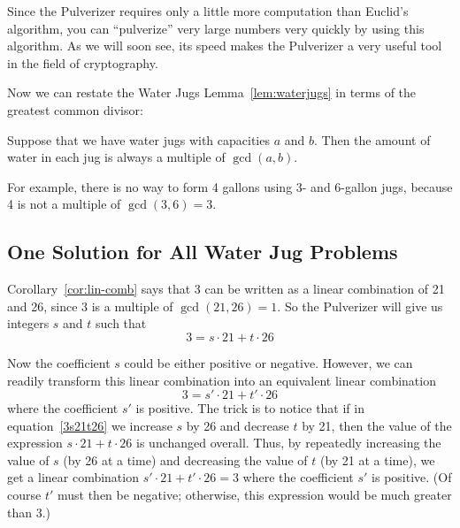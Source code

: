Since the Pulverizer requires only a little more computation than
Euclid's algorithm, you can ``pulverize'' very large numbers very
quickly by using this algorithm.  As we will soon see, its speed makes
the Pulverizer a very useful tool in the field of cryptography.

Now we can restate the Water Jugs Lemma~\ref{lem:waterjugs} in terms
of the greatest common divisor:
\begin{corollary}\label{cor:waterjugs}
Suppose that we have water jugs with capacities $a$ and $b$.  Then the
amount of water in each jug is always a multiple of $\gcd(a, b)$.
\end{corollary}

For example, there is no way to form 4 gallons using 3- and 6-gallon
jugs, because 4 is not a multiple of $\gcd(3, 6) = 3$.

\subsection{One Solution for All Water Jug Problems}\label{all_jugs_son_sec}

Corollary~\ref{cor:lin-comb} says that 3 can be written as a linear
combination of 21 and 26, since 3 is a multiple of $\gcd(21, 26) = 1$.
So the Pulverizer will give us integers $s$ and $t$ such that
\begin{equation}\label{3s21t26}
3 = s \cdot 21 + t \cdot 26
\end{equation}

Now the coefficient $s$ could be either positive or negative.
However, we can readily transform this linear combination into an
equivalent linear combination
\begin{equation}\label{3sprime21}
3 = s' \cdot 21 + t' \cdot 26
\end{equation}
where the coefficient $s'$ is positive.  The trick is to notice that
if in equation~\eqref{3s21t26} we increase $s$ by 26 and decrease $t$
by 21, then the value of the expression $s \cdot 21 + t \cdot 26$ is
unchanged overall.  Thus, by repeatedly increasing the value of $s$
(by 26 at a time) and decreasing the value of $t$ (by 21 at a time),
we get a linear combination $s' \cdot 21 + t' \cdot 26 = 3$ where the
coefficient $s'$ is positive.  (Of course $t'$ must then be negative;
otherwise, this expression would be much greater than 3.)

